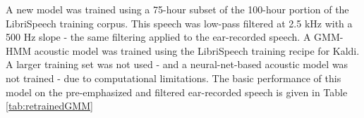 % 
% 


A new model was trained using a 75-hour subset of the 100-hour portion of the LibriSpeech training corpus.  This speech was low-pass filtered at 2.5 kHz with a 500 Hz slope - the same filtering applied to the ear-recorded speech.  A GMM-HMM acoustic model was trained using the LibriSpeech training recipe for Kaldi.  A larger training set was not used - and a neural-net-based acoustic model was not trained - due to computational limitations.  The basic performance of this model on the pre-emphasized and filtered ear-recorded speech is given in Table \ref{tab:retrainedGMM}

